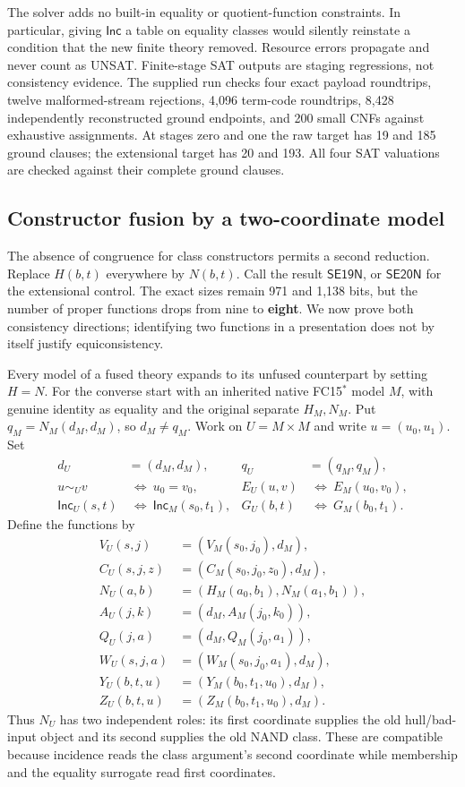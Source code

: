 The solver adds no built-in equality or quotient-function constraints.
In particular, giving $\mathsf{Inc}$ a table on equality classes would
silently reinstate a condition that the new finite theory removed.
Resource errors propagate and never count as UNSAT. Finite-stage SAT
outputs are staging regressions, not consistency evidence. The supplied
run checks four exact payload roundtrips, twelve malformed-stream
rejections, 4,096 term-code roundtrips, 8,428 independently reconstructed
ground endpoints, and 200 small CNFs against exhaustive assignments.
At stages zero and one the raw target has 19 and 185 ground clauses;
the extensional target has 20 and 193. All four SAT valuations are
checked against their complete ground clauses.

\subsection{Constructor fusion by a two-coordinate model}
\label{se:fusion}

The absence of congruence for class constructors permits a second
reduction. Replace $H(b,t)$ everywhere by $N(b,t)$. Call the result
$\mathsf{SE19N}$, or $\mathsf{SE20N}$ for the extensional control.
The exact sizes remain 971 and 1,138 bits, but the number of proper
functions drops from nine to \textbf{eight}. We now prove both
consistency directions; identifying two functions in a presentation
does not by itself justify equiconsistency.

Every model of a fused theory expands to its unfused counterpart by
setting $H=N$. For the converse start with an inherited native
FC15$^*$ model $M$, with genuine identity as equality and the original
separate $H_M,N_M$. Put $q_M=N_M(d_M,d_M)$, so $d_M\ne q_M$.
Work on $U=M\times M$ and write $u=(u_0,u_1)$. Set
\begin{align*}
 d_U&=(d_M,d_M),&q_U&=(q_M,q_M),\\
 u\sim_U v&\ \Longleftrightarrow\ u_0=v_0,&
 E_U(u,v)&\ \Longleftrightarrow\ E_M(u_0,v_0),\\
 \mathsf{Inc}_U(s,t)&\ \Longleftrightarrow\
             \mathsf{Inc}_M(s_0,t_1),&
 G_U(b,t)&\ \Longleftrightarrow\ G_M(b_0,t_1).
\end{align*}
Define the functions by
\begin{align*}
 V_U(s,j)&=(V_M(s_0,j_0),d_M),\\
 C_U(s,j,z)&=(C_M(s_0,j_0,z_0),d_M),\\
 N_U(a,b)&=(H_M(a_0,b_1),N_M(a_1,b_1)),\\
 A_U(j,k)&=(d_M,A_M(j_0,k_0)),\\
 Q_U(j,a)&=(d_M,Q_M(j_0,a_1)),\\
 W_U(s,j,a)&=(W_M(s_0,j_0,a_1),d_M),\\
 Y_U(b,t,u)&=(Y_M(b_0,t_1,u_0),d_M),\\
 Z_U(b,t,u)&=(Z_M(b_0,t_1,u_0),d_M).
\end{align*}
Thus $N_U$ has two independent roles: its first coordinate supplies
the old hull/bad-input object and its second supplies the old NAND
class. These are compatible because incidence reads the class argument's
second coordinate while membership and the equality surrogate read
first coordinates.

